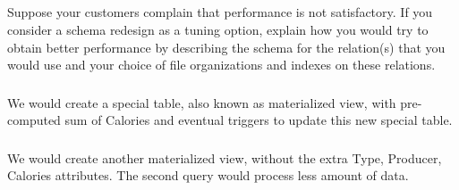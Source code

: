 \subsection{}
{\color{gray}Suppose your customers complain that performance is not satisfactory. If you consider a schema redesign as a tuning option, explain how you would try to obtain better performance by describing the schema for the relation(s) that you would use and your choice of file organizations and indexes on these relations.}
\subsubsection{}
We would create a special table, also known as materialized view, with pre-computed sum of Calories and eventual triggers to update this new special table.
\subsubsection{}
We would create another materialized view, without the extra Type, Producer, Calories attributes. The second query would process less amount of data.


